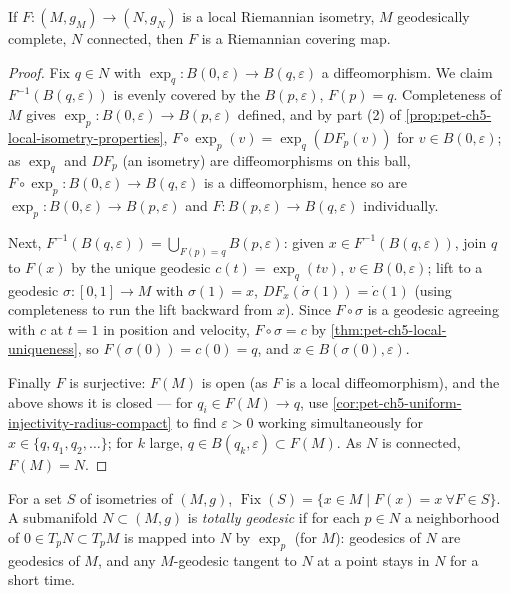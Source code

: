 \begin{lemma}
  \label{lem:pet-ch5-local-isometry-covering}
  If $F:(M,g_M)\to(N,g_N)$ is a local Riemannian isometry, $M$ geodesically
  complete, $N$ connected, then $F$ is a Riemannian covering map.
\end{lemma}
\begin{proof}
  Fix $q\in N$ with $\exp_q:B(0,\varepsilon)\to B(q,\varepsilon)$ a diffeomorphism.
  We claim $F^{-1}(B(q,\varepsilon))$ is evenly covered by the $B(p,\varepsilon)$,
  $F(p)=q$. Completeness of $M$ gives $\exp_p:B(0,\varepsilon)\to B(p,\varepsilon)$
  defined, and by part (2) of \cref{prop:pet-ch5-local-isometry-properties},
  $F\circ\exp_p(v)=\exp_q(DF_p(v))$ for $v\in B(0,\varepsilon)$; as $\exp_q$ and
  $DF_p$ (an isometry) are diffeomorphisms on this ball, $F\circ\exp_p:B(0,\varepsilon)
  \to B(q,\varepsilon)$ is a diffeomorphism, hence so are $\exp_p:B(0,\varepsilon)\to
  B(p,\varepsilon)$ and $F:B(p,\varepsilon)\to B(q,\varepsilon)$ individually.

  Next, $F^{-1}(B(q,\varepsilon))=\bigcup_{F(p)=q}B(p,\varepsilon)$: given
  $x\in F^{-1}(B(q,\varepsilon))$, join $q$ to $F(x)$ by the unique geodesic
  $c(t)=\exp_q(tv)$, $v\in B(0,\varepsilon)$; lift to a geodesic $\sigma:[0,1]\to M$
  with $\sigma(1)=x$, $DF_x(\dot\sigma(1))=\dot c(1)$ (using completeness to run the
  lift backward from $x$). Since $F\circ\sigma$ is a geodesic agreeing with $c$ at
  $t=1$ in position and velocity, $F\circ\sigma=c$ by
  \cref{thm:pet-ch5-local-uniqueness}, so $F(\sigma(0))=c(0)=q$, and
  $x\in B(\sigma(0),\varepsilon)$.

  Finally $F$ is surjective: $F(M)$ is open (as $F$ is a local diffeomorphism), and
  the above shows it is closed — for $q_i\in F(M)\to q$, use
  \cref{cor:pet-ch5-uniform-injectivity-radius-compact} to find $\varepsilon>0$
  working simultaneously for $x\in\{q,q_1,q_2,\dots\}$; for $k$ large, $q\in
  B(q_k,\varepsilon)\subset F(M)$. As $N$ is connected, $F(M)=N$.
\end{proof}

\begin{definition}
  \label{def:pet-ch5-fixed-point-set}
  For a set $S$ of isometries of $(M,g)$, $\operatorname{Fix}(S)=\{x\in M\mid
  F(x)=x\ \forall F\in S\}$. A submanifold $N\subset(M,g)$ is \emph{totally
  geodesic} if for each $p\in N$ a neighborhood of $0\in T_pN\subset T_pM$ is
  mapped into $N$ by $\exp_p$ (for $M$): geodesics of $N$ are geodesics of $M$, and
  any $M$-geodesic tangent to $N$ at a point stays in $N$ for a short time.
\end{definition}

